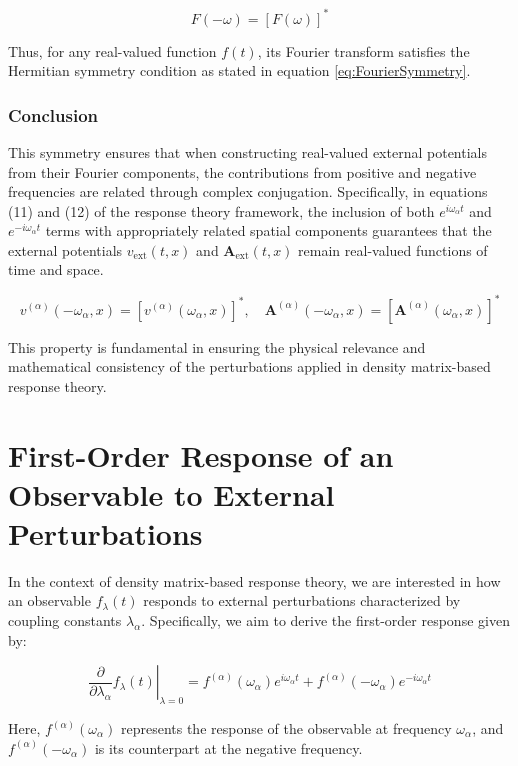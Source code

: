 \[
F(-\omega) = [F(\omega)]^*
\]

Thus, for any real-valued function \( f(t) \), its Fourier transform satisfies the Hermitian symmetry condition as stated in equation \eqref{eq:FourierSymmetry}.

\subsubsection*{Conclusion}

This symmetry ensures that when constructing real-valued external potentials from their Fourier components, the contributions from positive and negative frequencies are related through complex conjugation. Specifically, in equations (11) and (12) of the response theory framework, the inclusion of both \( e^{i \omega_{\alpha} t} \) and \( e^{-i \omega_{\alpha} t} \) terms with appropriately related spatial components guarantees that the external potentials \( v_{\text{ext}}(t, x) \) and \( \mathbf{A}_{\text{ext}}(t, x) \) remain real-valued functions of time and space.

\[
v^{(\alpha)}(-\omega_{\alpha}, x) = [v^{(\alpha)}(\omega_{\alpha}, x)]^*, \quad \mathbf{A}^{(\alpha)}(-\omega_{\alpha}, x) = [\mathbf{A}^{(\alpha)}(\omega_{\alpha}, x)]^*
\]

This property is fundamental in ensuring the physical relevance and mathematical consistency of the perturbations applied in density matrix-based response theory.

\section{First-Order Response of an Observable to External Perturbations}
\label{sec:firstOrderResponse}


In the context of density matrix-based response theory, we are interested in how an observable \( f_{\lambda}(t) \) responds to external perturbations characterized by coupling constants \( \lambda_{\alpha} \). Specifically, we aim to derive the first-order response given by:

\begin{equation}
\left.\frac{\partial}{\partial \lambda_{\alpha}} f_{\lambda}(t)\right|_{\lambda=0} = f^{(\alpha)}(\omega_{\alpha}) e^{i \omega_{\alpha} t} + f^{(\alpha)}(-\omega_{\alpha}) e^{-i \omega_{\alpha} t} 
\end{equation}

Here, \( f^{(\alpha)}(\omega_{\alpha}) \) represents the response of the observable at frequency \( \omega_{\alpha} \), and \( f^{(\alpha)}(-\omega_{\alpha}) \) is its counterpart at the negative frequency.

